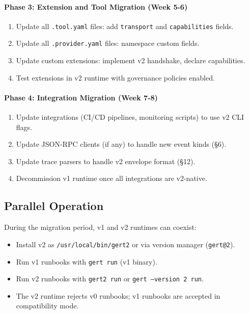 \paragraph{Phase 3: Extension and Tool Migration (Week 5-6)}
\begin{enumerate}
  \item Update all \texttt{.tool.yaml} files: add \texttt{transport} and \texttt{capabilities} fields.
  \item Update all \texttt{.provider.yaml} files: namespace custom fields.
  \item Update custom extensions: implement v2 handshake, declare capabilities.
  \item Test extensions in v2 runtime with governance policies enabled.
\end{enumerate}

\paragraph{Phase 4: Integration Migration (Week 7-8)}
\begin{enumerate}
  \item Update integrations (CI/CD pipelines, monitoring scripts) to use v2 CLI flags.
  \item Update JSON-RPC clients (if any) to handle new event kinds (§6).
  \item Update trace parsers to handle v2 envelope format (§12).
  \item Decommission v1 runtime once all integrations are v2-native.
\end{enumerate}

\subsection{Parallel Operation}

During the migration period, v1 and v2 runtimes can coexist:

\begin{itemize}
  \item Install v2 as \texttt{/usr/local/bin/gert2} or via version manager (\texttt{gert@2}).
  \item Run v1 runbooks with \texttt{gert run} (v1 binary).
  \item Run v2 runbooks with \texttt{gert2 run} or \texttt{gert --version 2 run}.
  \item The v2 runtime rejects v0 runbooks; v1 runbooks are accepted in compatibility mode.
\end{itemize}


